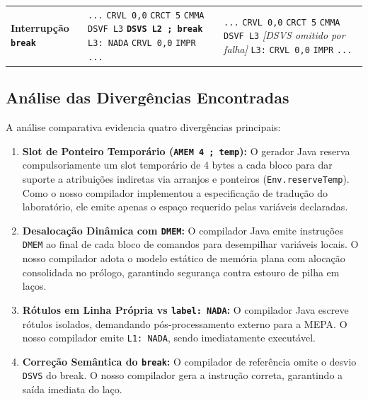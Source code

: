 \documentclass[12pt,a4paper]{article}
\begin{document}
\begin{longtable}{p{2.6cm}p{6.4cm}p{6.4cm}}
\textbf{Interrupção \texttt{break}} &
\texttt{...}\newline
\texttt{CRVL 0,0}\newline
\texttt{CRCT 5}\newline
\texttt{CMMA}\newline
\texttt{DSVF L3}\newline
\texttt{\textbf{DSVS L2 ; break}}\newline
\texttt{L3: NADA}\newline
\texttt{CRVL 0,0}\newline
\texttt{IMPR}\newline
\texttt{...} &
\texttt{...}\newline
\texttt{CRVL 0,0}\newline
\texttt{CRCT 5}\newline
\texttt{CMMA}\newline
\texttt{DSVF L3}\newline
\textit{[DSVS omitido por falha]}\newline
\texttt{L3:}\newline
\texttt{CRVL 0,0}\newline
\texttt{IMPR}\newline
\texttt{...} \\
\end{longtable}

\subsection{Análise das Divergências Encontradas}

A análise comparativa evidencia quatro divergências principais:

\begin{enumerate}
    \item \textbf{Slot de Ponteiro Temporário (\texttt{AMEM 4 ; temp}):} O gerador Java
          reserva compulsoriamente um slot temporário de 4 bytes a cada bloco para dar
          suporte a atribuições indiretas via arranjos e ponteiros (\texttt{Env.reserveTemp}).
          Como o nosso compilador implementou a especificação de tradução do laboratório,
          ele emite apenas o espaço requerido pelas variáveis declaradas.
    \item \textbf{Desalocação Dinâmica com \texttt{DMEM}:} O compilador Java emite
          instruções \texttt{DMEM} ao final de cada bloco de comandos para desempilhar
          variáveis locais. O nosso compilador adota o modelo estático de memória plana
          com alocação consolidada no prólogo, garantindo segurança contra estouro de
          pilha em laços.
    \item \textbf{Rótulos em Linha Própria vs \texttt{label: NADA}:} O compilador Java
          escreve rótulos isolados, demandando pós-processamento externo para a MEPA.
          O nosso compilador emite \texttt{L1: NADA}, sendo imediatamente executável.
    \item \textbf{Correção Semântica do \texttt{break}:} O compilador de referência
          omite o desvio \texttt{DSVS} do break. O nosso compilador gera a instrução
          correta, garantindo a saída imediata do laço.
\end{enumerate}
\end{document}
